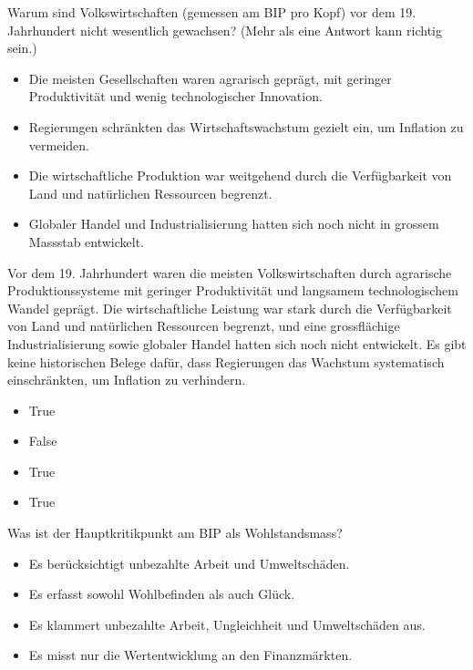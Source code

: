 \documentclass[
  nswissgerman,
  a4paper,
  DIV=11,
  numbers=noendperiod,
  oneside,
  openany]{scrreprt}
\providecommand{\tightlist}{%
  \setlength{\itemsep}{0pt}\setlength{\parskip}{0pt}}
\begin{document}
Warum sind Volkswirtschaften (gemessen am BIP pro Kopf) vor dem 19.
Jahrhundert nicht wesentlich gewachsen? (Mehr als eine Antwort kann
richtig sein.)

\begin{itemize}
\tightlist
\item[$\square$]
  Die meisten Gesellschaften waren agrarisch geprägt, mit geringer
  Produktivität und wenig technologischer Innovation.
\item[$\square$]
  Regierungen schränkten das Wirtschaftswachstum gezielt ein, um
  Inflation zu vermeiden.
\item[$\square$]
  Die wirtschaftliche Produktion war weitgehend durch die Verfügbarkeit
  von Land und natürlichen Ressourcen begrenzt.
\item[$\square$]
  Globaler Handel und Industrialisierung hatten sich noch nicht in
  grossem Massstab entwickelt.
\end{itemize}

Vor dem 19. Jahrhundert waren die meisten Volkswirtschaften durch
agrarische Produktionssysteme mit geringer Produktivität und langsamem
technologischem Wandel geprägt. Die wirtschaftliche Leistung war stark
durch die Verfügbarkeit von Land und natürlichen Ressourcen begrenzt,
und eine grossflächige Industrialisierung sowie globaler Handel hatten
sich noch nicht entwickelt. Es gibt keine historischen Belege dafür,
dass Regierungen das Wachstum systematisch einschränkten, um Inflation
zu verhindern.

\begin{itemize}
\tightlist
\item
  True
\item
  False
\item
  True
\item
  True
\end{itemize}

Was ist der Hauptkritikpunkt am BIP als Wohlstandsmass?

\begin{itemize}
\tightlist
\item[$\square$]
  Es berücksichtigt unbezahlte Arbeit und Umweltschäden.
\item[$\square$]
  Es erfasst sowohl Wohlbefinden als auch Glück.
\item[$\square$]
  Es klammert unbezahlte Arbeit, Ungleichheit und Umweltschäden aus.
\item[$\square$]
  Es misst nur die Wertentwicklung an den Finanzmärkten.
\end{itemize}
\end{document}
